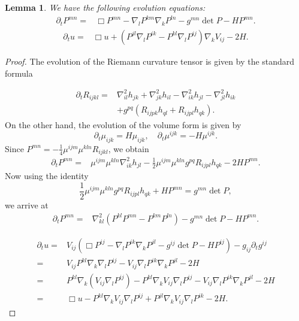 \documentclass{amsart}
\newtheorem{lemma}[theorem]{Lemma}
\theoremstyle{definition}
\theoremstyle{remark}
\numberwithin{equation}{section}
\begin{document}
\begin{lemma}
We have the following evolution equations:
\begin{align}
\partial_tP^{mn}=&\Box P^{mn}-\nabla_lP^{km}\nabla_kP^{ln}-g^{mn}\det P-HP^{mn}.
\end{align}
\begin{align}
\partial_t u=&\Box u+\left(P^{jl}\nabla_lP^{ik}-P^{kl}\nabla_l P^{ij}\right)\nabla_kV_{ij}-2H.
\end{align}
\end{lemma}
\begin{proof}
The evolution of the Riemann curvature tensor is given by the standard formula

\begin{align*}
\partial_t R_{ijkl}=&\nabla_{il}^2h_{jk}+\nabla^2_{jk}h_{il}-\nabla^2_{ik}h_{jl}-\nabla^2_{jl}h_{ik}\\
&+g^{pq}(R_{ijpk}h_{ql}+R_{ijpl}h_{qk}).
\end{align*}
On the other hand, the evolution of the volume form is given by $$\partial_t\mu_{ijk}=H\mu_{ijk},\quad\partial_t\mu^{ijk}=-H\mu^{ijk}.$$
Since $P^{mn}=-\frac{1}{4}\mu^{ijm}\mu^{kln}R_{ijkl}$, we obtain
\begin{align*}
\partial_tP^{mn}=&\mu^{ijm}\mu^{kln}\nabla^2_{ik}h_{jl}-\frac{1}{2}\mu^{ijm}\mu^{kln}g^{pq}R_{ijpl}h_{qk}-2HP^{mn}.
\end{align*}
Now using the identity
\[\frac{1}{2}\mu^{ijm}\mu^{kln}g^{pq}R_{ijpl}h_{qk}+HP^{mn}=g^{mn}\det P,\]
we arrive at
\begin{align*}
\partial_tP^{mn}=&\nabla^2_{kl}(P^{kl}P^{mn}-P^{km}P^{ln})-g^{mn}\det P-HP^{mn}.
\end{align*}

\begin{align*}
\partial_t u=& V_{ij}\left(\Box P^{ij}-\nabla_lP^{ik}\nabla_kP^{jl}-g^{ij}\det P -HP^{ij}\right)- g_{ij}\partial_t g^{ij}\\
=&V_{ij}P^{kl}\nabla_k\nabla_lP^{ij}- V_{ij}\nabla_lP^{ik}\nabla_kP^{jl}-2H\\
=&P^{kl}\nabla_k\left(V_{ij}\nabla_lP^{ij}\right)-P^{kl}\nabla_k V_{ij}\nabla_l P^{ij}-V_{ij}\nabla_lP^{ik}\nabla_kP^{jl}-2H\\
=&\Box u-P^{kl}\nabla_k V_{ij}\nabla_l P^{ij}+P^{jl}\nabla_kV_{ij}\nabla_lP^{ik}-2H.
\end{align*}
\end{proof}
\end{document}
